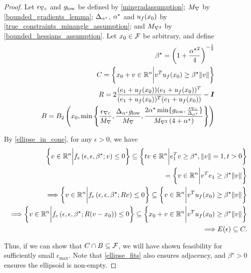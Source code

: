 \begin{proof}

Let ${\epsilon_{\nabla c}}$ and ${ g_{\textrm{low}} }$ be defined by \cref{mingradassumption};
${M_{\nabla}}$ by \cref{bounded_gradients_lemma};
${\Delta_{\alpha^{\star}}}$, ${ \alpha^{\star} }$ and ${u_{f}(x_0)}$ by \cref{true_constraints_minangle_assumption};
and ${M_{\nabla^2}}$ by \cref{bounded_hessians_assumption}.
Let $x_0 \in {\mathcal F}$ be arbitrary, and define
\begin{align*}
\beta^{\star} = \left(1 + \frac {{ \alpha^{\star} }^2} 4\right)^{-\frac 1 2} \\
C = \left\{x_0 + v \in \mathbb R^n \bigg | v^T{u_{f}(x_0)} \ge \beta^{\star} \|v\| \right\} \\
R = 2\frac{(e_1 + {u_{f}(x_0)})(e_1 + {u_{f}(x_0)})^T}{(e_1 + {u_{f}(x_0)})^T(e_1 + {u_{f}(x_0)})} - \boldsymbol I \\
B = B_2\left(x_0, \min\left\{
\frac {{\epsilon_{\nabla c}}} {{M_{\nabla}}}, \frac{{\Delta_{\alpha^{\star}}} { g_{\textrm{low}} }}{{M_{\nabla}}},
 \frac {2{ \alpha^{\star} }  \min\{{ g_{\textrm{low}} }, \frac{{\epsilon_{\nabla c}}}{{\Delta_{\alpha^{\star}}}}\}}{{M_{\nabla^2}}\left(4 + { \alpha^{\star} }\right)}
\right\}\right)
\end{align*}

By \cref{ellipse_in_cone}, for any $\epsilon > 0$, we have
\begin{align*}
\left\{v \in \mathbb R^n \bigg| f_e\left(\epsilon, \epsilon, \beta^{\star}; v\right) \le 0\right\}
\subseteq \left\{tv\in\mathbb R^n\bigg| e_1^T v \ge \beta^{\star},\|v\|=1, t>0\right\} \\
\
=
\left\{v\in\mathbb R^n\bigg| v^Te_1 \ge \beta^{\star}\|v\|\right\} \\
\
\Longrightarrow \left\{v \in \mathbb R^n \bigg| f_e\left(\epsilon, \epsilon, \beta^{\star}; Rv\right) \le 0\right\}
\subseteq \left\{v\in\mathbb R^n\bigg| v^T{u_{f}(x_0)} \ge \beta^{\star}\|v\|\right\} \\
\
\Longrightarrow \left\{v \in \mathbb R^n \bigg| f_e\left(\epsilon, \epsilon, \beta^{\star}; R(v - x_0)\right) \le 0\right\}
\subseteq \left\{x_0+ v\in\mathbb R^n\bigg| v^T{u_{f}(x_0)} \ge \beta^{\star}\|v\|\right\} \\
\Longrightarrow E(\epsilon) \subseteq C.
\end{align*}

Thus, if we can show that $C \cap B \subseteq {\mathcal F}$, we will have shown feasibility for sufficiently small $\epsilon_{\textrm{max}}$.
Note that \cref{ellipse_fits} also ensures adjacency, and $\beta^{\star} > 0$ ensures the ellipsoid is non-empty.


\end{proof}
